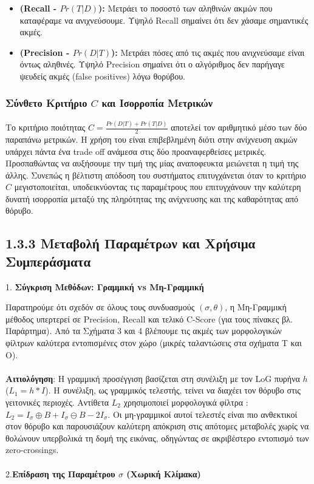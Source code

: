 \documentclass[12pt,a4paper]{article}
\begin{document}
\begin{itemize}
    \item \textbf{(\foreignlanguage{english}{Recall} - $Pr(T|D)$):} Μετράει το ποσοστό των αληθινών ακμών που καταφέραμε να ανιχνεύσουμε. Υψηλό \foreignlanguage{english}{Recall} σημαίνει ότι δεν χάσαμε σημαντικές ακμές.
    \item \textbf{(\foreignlanguage{english}{Precision} - $Pr(D|T)$):} Μετράει πόσες από τις ακμές που ανιχνεύσαμε είναι όντως αληθινές. Υψηλό \foreignlanguage{english}{Precision} σημαίνει ότι ο αλγόριθμος δεν παρήγαγε ψευδείς ακμές (\foreignlanguage{english}{false positives}) λόγω θορύβου.
\end{itemize}

\subsubsection*{Σύνθετο Κριτήριο $C$ και Ισορροπία Μετρικών}
\hspace{0.6cm}Το κριτήριο ποιότητας $C = \frac{Pr(D|T) + Pr(T|D)}{2}$ αποτελεί τον αριθμητικό μέσο των δύο παραπάνω μετρικών. Η χρήση του είναι επιβεβλημένη διότι στην ανίχνευση ακμών υπάρχει πάντα ένα \foreignlanguage{english}{trade off} ανάμεσα στις δύο προαναφερθείσες μετρικές. Προσπαθώντας να αυξήσουμε την τιμή της μίας αναποφευκτα μειώνεται η τιμή της άλλης. Συνεπώς η βέλτιστη απόδοση του συστήματος επιτυγχάνεται όταν το κριτήριο $C$ μεγιστοποιείται, υποδεικνύοντας τις παραμέτρους που επιτυγχάνουν την καλύτερη δυνατή ισορροπία μεταξύ της πληρότητας της ανίχνευσης και της καθαρότητας από θόρυβο.

\subsection*{1.3.3 Μεταβολή Παραμέτρων και Χρήσιμα Συμπεράσματα}

1. \textbf{Σύγκριση Μεθόδων: Γραμμική \foreignlanguage{english}{vs} Μη-Γραμμική }

Παρατηρούμε ότι σχεδόν σε όλους τους συνδυασμούς $(\sigma, \theta)$, η Μη-Γραμμική μέθοδος υπερτερεί σε \foreignlanguage{english}{Precision}, \foreignlanguage{english}{Recall} και τελικό \foreignlanguage{english}{C-Score} (για τους πίνακες βλ. Παράρτημα). Από τα Σχήματα 3 και 4 βλέπουμε τις ακμές των μορφολογικών φίλτρων καλύτερα εντοπισμένες στον χώρο (μικρές ταλαντώσεις στα σχήματα Τ και Ο). 
\\\\
\textbf{Αιτιολόγηση}: 
Η γραμμική προσέγγιση  βασίζεται στη συνέλιξη με τον \foreignlanguage{english}{LoG} πυρήνα $h$ ($L_1 = h * I$). Η συνέλιξη, ως γραμμικός τελεστής, τείνει να διαχέει τον θόρυβο στις γειτονικές περιοχές. Αντίθετα $L_2$ χρησιμοποιεί μορφολογικά φίλτρα : $L_2 = I_{\sigma} \oplus B + I_{\sigma} \ominus B - 2I_{\sigma}$. Οι μη-γραμμικοί αυτοί τελεστές είναι πιο ανθεκτικοί στον θόρυβο και παρουσιάζουν καλύτερη απόκριση στις απότομες μεταβολές χωρίς να θολώνουν υπερβολικά τη δομή της εικόνας, οδηγώντας σε ακριβέστερο εντοπισμό των \foreignlanguage{english}{zero-crossings}.
\\\\
2.\textbf{Επίδραση της Παραμέτρου $\sigma$ (Χωρική Κλίμακα)} 
\end{document}
